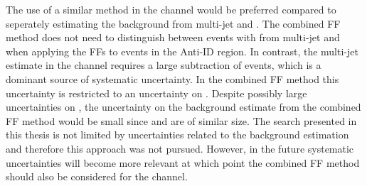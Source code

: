 The use of a similar method in the \hadhad channel would be preferred compared
to seperately estimating the \faketauhadvis background from multi-jet and
\ttbar. The combined FF method does not need to distinguish between events with
\faketauhadvis from multi-jet and \ttbar when applying the FFs to events in the
Anti-ID region. In contrast, the multi-jet estimate in the \hadhad channel
requires a large subtraction of \ttbarFakes events, which is a dominant source
of systematic uncertainty. In the combined FF method this uncertainty is
restricted to an uncertainty on \rqcd. Despite possibly large uncertainties on
\rqcd, the uncertainty on the \faketauhadvis background estimate from the
combined FF method would be small since \FFqcd and \FFttbar are of similar
size. The search presented in this thesis is not limited by uncertainties
related to the \faketauhadvis background estimation and therefore this approach
was not pursued. However, in the future systematic uncertainties will become
more relevant at which point the combined FF method should also be considered
for the \hadhad channel.



